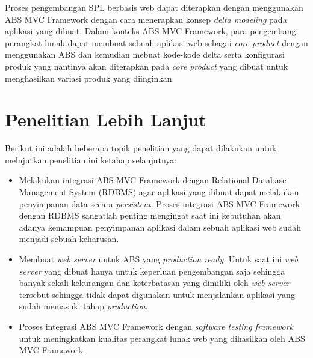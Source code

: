 Proses pengembangan SPL berbasis web dapat diterapkan dengan menggunakan ABS MVC Framework dengan cara menerapkan konsep \textit{delta modeling} pada aplikasi yang dibuat. Dalam konteks ABS MVC Framework, para pengembang perangkat lunak dapat membuat sebuah aplikasi web sebagai \textit{core product} dengan menggunakan ABS dan kemudian mebuat kode-kode delta serta konfigurasi produk yang nantinya akan diterapkan pada \textit{core product} yang dibuat untuk menghasilkan variasi produk yang diinginkan.\\

\section{Penelitian Lebih Lanjut}
Berikut ini adalah beberapa topik penelitian yang dapat dilakukan untuk melnjutkan penelitian ini ketahap selanjutnya:

\begin{itemize}
    \item Melakukan integrasi ABS MVC Framework dengan Relational Database Management System (RDBMS) agar aplikasi yang dibuat dapat melakukan penyimpanan data secara \textit{persistent}. Proses integrasi ABS MVC Framework dengan RDBMS sangatlah penting mengingat saat ini kebutuhan akan adanya kemampuan penyimpanan aplikasi dalam sebuah aplikasi web sudah menjadi sebuah keharusan.
    \item Membuat \textit{web server} untuk ABS yang \textit{production ready}. Untuk saat ini \textit{web server} yang dibuat hanya untuk keperluan pengembangan saja sehingga banyak sekali kekurangan dan keterbatasan yang dimiliki oleh \textit{web server} tersebut sehingga tidak dapat digunakan untuk menjalankan aplikasi yang sudah memasuki tahap \textit{production}.
    \item Proses integrasi ABS MVC Framework dengan \textit{software testing framework} untuk meningkatkan kualitas perangkat lunak web yang dihasilkan oleh ABS MVC Framework.
\end{itemize}